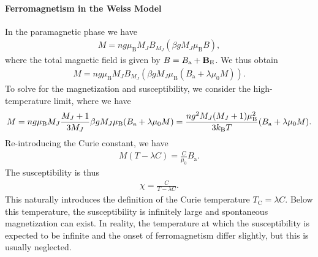 \paragraph{Ferromagnetism in the Weiss Model}
In the paramagnetic phase we have
\begin{align*}
	M = ng\mu_{\text{B}}M_{J}B_{M_{J}}\left(\beta gM_{J}\mu_{\text{B}}B\right),
\end{align*}
where the total magnetic field is given by $B = B_{\text{a}} + \vb{B}_{\text{E}}$. We thus obtain
\begin{align*}
	M = ng\mu_{\text{B}}M_{J}B_{M_{J}}\left(\beta gM_{J}\mu_{\text{B}}(B_{\text{a}} + \lambda\mu_{0}M)\right).
\end{align*}
To solve for the magnetization and susceptibility, we consider the high-temperature limit, where we have
\begin{align*}
	M = ng\mu_{\text{B}}M_{J}\frac{M_{J} + 1}{3M_{J}}\beta gM_{J}\mu_{\text{B}}(B_{\text{a}} + \lambda\mu_{0}M) = \frac{ng^{2}M_{J}(M_{J} + 1)\mu_{\text{B}}^{2}}{3k_{\text{B}} T}(B_{\text{a}} + \lambda\mu_{0}M).
\end{align*}
Re-introducing the Curie constant, we have
\begin{align*}
	M(T - \lambda C) = \frac{C}{\mu_{0}}B_{\text{a}}.
\end{align*}
The susceptibility is thus
\begin{align*}
	\chi = \frac{C}{T - \lambda C}.
\end{align*}
This naturally introduces the definition of the Curie temperature $T_{\text{C}} = \lambda C$. Below this temperature, the susceptibility is infinitely large and spontaneous magnetization can exist. In reality, the temperature at which the susceptibility is expected to be infinite and the onset of ferromagnetism differ slightly, but this is usually neglected.

